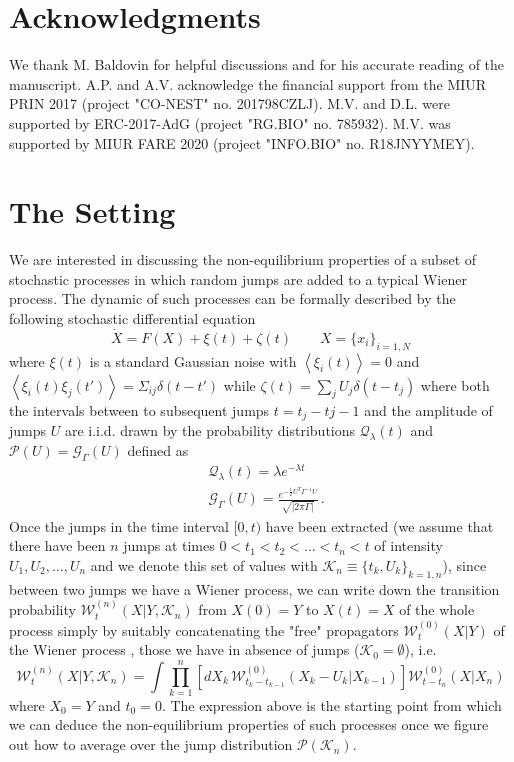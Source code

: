 \documentclass[12pt]{iopart}
\newcommand{\lx} {\left}
\newcommand{\rx} {\right}
\newcommand{\ave}[1] {\lx\langle #1 \rx\rangle}
\newcommand{\cP} {\mathcal{P}}
\newcommand{\cW} {\mathcal{W}}
\newcommand{\cG} {\mathcal{G}}
\newcommand{\cK} {\mathcal{K}}
\newcommand{\cQ} {\mathcal{Q}}
\begin{document}
\label{sec:concl}
\section*{Acknowledgments}
We thank M. Baldovin for helpful discussions and for his accurate reading of the manuscript. A.P. and A.V. acknowledge the financial support from the MIUR PRIN 2017 (project "CO-NEST" no. 201798CZLJ). M.V. and D.L. were supported by ERC-2017-AdG (project "RG.BIO" no. 785932). M.V. was supported by MIUR FARE 2020 (project "INFO.BIO" no. R18JNYYMEY).

\appendix
\section{The Setting}
We are interested in discussing the non-equilibrium properties of a subset of stochastic processes in which random jumps are added to a typical Wiener process.
The dynamic of such processes can be formally described by the following stochastic differential equation
\begin{equation}
    \dot{X} = F(X) + \xi(t) + \zeta(t) \qquad X=\{x_i\}_{i=1,N}
\end{equation}
where $\xi(t)$ is a standard Gaussian noise with $\ave{\xi_i(t)}=0$ and $\ave{\xi_i(t)\xi_j(t')}=\Sigma_{ij}\delta(t-t')$ while $\zeta(t)=\sum_j U_j \delta(t-t_j)$ where both the intervals between to subsequent jumps $t=t_{j}-t{j-1}$ and the amplitude of jumps $U$ are i.i.d. drawn by the probability distributions $\cQ_\lambda(t)$ and $\cP(U)=\cG_\Gamma(U)$ defined as
\begin{eqnarray}
    &\cQ_\lambda(t) = \lambda e^{-\lambda t}\\
    & \cG_\Gamma(U) = \frac{e^{-\frac{1}{2}U^T\Gamma^{-1}U}}{\sqrt{|2\pi\Gamma|}}\,.
\end{eqnarray}
Once the jumps in the time interval $[0,t)$ have been extracted (we assume that there have been $n$ jumps at times $0<t_1<t_2<\dots<t_n<t$ of intensity $U_1,U_2,\dots,U_n$ and we denote this set of values with $\cK_n\equiv \{t_k,U_k\}_{k=1,n}$), since between two jumps we have a Wiener process, we can write down the transition probability $\cW^{(n)}_t(X|Y,\cK_n)$ from $X(0)=Y$ to $X(t)=X$ of the whole process simply by suitably concatenating the "free" propagators $\cW^{(0)}_t(X|Y)$ of the Wiener process , those we have in absence of jumps ($\cK_0=\emptyset$), i.e. 
\begin{equation}
\cW^{(n)}_t(X|Y,\cK_n) = \int \prod_{k=1}^n \lx[ dX_k \, \cW^{(0)}_{t_k - t_{k-1}}( X_k - U_k|X_{k-1}) \rx] \cW^{(0)}_{t-t_n}(X|X_n)
\end{equation}
where $X_0=Y$ and $t_0=0$.
The expression above is the starting point from which we can deduce the non-equilibrium properties of such processes once we figure out how to average over the jump distribution $\cP(\cK_n)$.
\end{document}
